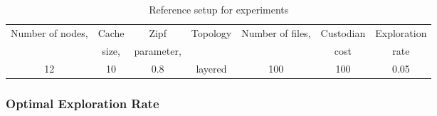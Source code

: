 \begin{comment}
\begin{table}[h]
\centering
\begin{tabular}{c |c|c|c|c|c|c|c}
\hline
 Experiment  & Nodes & Cache & Zipf & Topology & Files & Custodian & Exploration \\            &        &  Size & parameter & &  &Cost & Rate \\
 \ref{sub:exp}& 24 & 10 & 0.8 & layered & 100 & 100 & variable\\
 \ref{sub:space_diversity}&  & 10 & 0.8 & tree & 100 & 100 &0.05 \\
 \ref{sub:cost_aware}& 12 & 10 & 0.8 & layered & 100 & variable &0.05\\
 \ref{sub:locality}& 12 & 10 & 0.8 & layered & 100 & 100 &0.05 \\
 \ref{sub:size}& 12 & variable & 0.8 & layered & 100 & 100 &0.05\\
  Zipf& 12 & 10 & variable & layered & 100 & 100 &0.05\\
 \hline
 \hline

\hline
\end{tabular}
\vspace{-0.1in}
\caption{Parameters used in experiments}
\label{tab:experiments}
\end{table}

\end{comment}


\setlength{\tabcolsep}{2pt} 


\begin{table}[h]
\centering
\footnotesize
\begin{tabular}{c|c|c|c|c|c|c}
\hline
  Number of nodes, & Cache & Zipf & Topology & Number of files, & Custodian & Exploration \\            
        &  size,  & parameter,  &  &   &cost & rate \\
  \hline
12 & 10 & 0.8 & layered & 100 & 100 &0.05 \\
 \hline
 \hline

\hline
\end{tabular}
\vspace{-0.1in}
\caption{Reference setup for experiments}
\label{tab:experiments}
\vspace{-0.2in}
\end{table}







 
 \subsubsection{Optimal Exploration Rate}
 \label{sub:exp}
 
